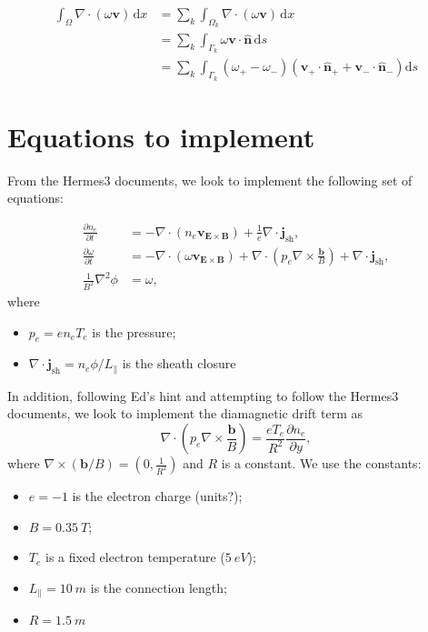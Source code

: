 \documentclass{article}
\begin{document}
\begin{align}
    \int_\Omega \nabla \cdot (\omega \bm{v}) \, \mathrm{d}x &= \sum_k \int_{\Omega_k} \nabla \cdot (\omega \bm{v}) \, \mathrm{d}x \\
    & = \sum_k \int_{\Gamma_k} \omega \bm{v} \cdot \bm{\hat{n}} \, \mathrm{d}s \\
    & = \sum_k \int_{\Gamma_k} (\omega_+ - \omega_-) \left( \bm{v}_+ \cdot \bm{\hat{n}_+} + \bm{v}_- \cdot \bm{\hat{n}_-} \right) \mathrm{d}s
\end{align}

\clearpage


\section{Equations to implement}

From the Hermes3 documents, we look to implement the following set of equations:

\begin{align}
    \frac{\partial n_e}{\partial t} &= -\nabla\cdot(n_e\bm{v}_{\bm{E} \times \bm{B}}) + \frac{1}{e}\nabla\cdot\bm{j}_{\text{sh}},\\
    \frac{\partial \omega}{\partial t} &= -\nabla\cdot(\omega\bm{v}_{\bm{E} \times \bm{B}}) + \nabla\cdot\left(p_e\nabla\times\frac{\bm{b}}{B} \right) + \nabla\cdot\bm{j}_{\text{sh}}, \\
    \frac{1}{B^2}\nabla^2\phi &= \omega, \label{eq:phi}
\end{align}
where
\begin{itemize}
    \item $p_e = en_eT_e$ is the pressure;
    \item $\nabla\cdot\bm{j}_{\text{sh}} = n_e\phi/L_{\parallel}$ is the
    sheath closure
\end{itemize}
In addition, following Ed's hint and attempting to follow the Hermes3 documents,
we look to implement the diamagnetic drift term as
\[
    \nabla\cdot\left(p_e\nabla\times\frac{\bm{b}}{B} \right) =
    \frac{eT_e}{R^2} \frac{\partial n_e}{\partial y},
\]
where $\nabla\times(\bm{b}/B) = (0,\frac{1}{R^2})$ and $R$ is a constant.
We use the constants:
\begin{itemize}
    \item $e = -1$ is the electron charge (units?);
    \item $B = \SI{0.35}{T}$;
    \item $T_e$ is a fixed electron temperature ($\SI{5}{eV}$);
    \item $L_\parallel = \SI{10}{m}$ is the connection length;
    \item $R = \SI{1.5}{m}$
\end{itemize}
\end{document}
